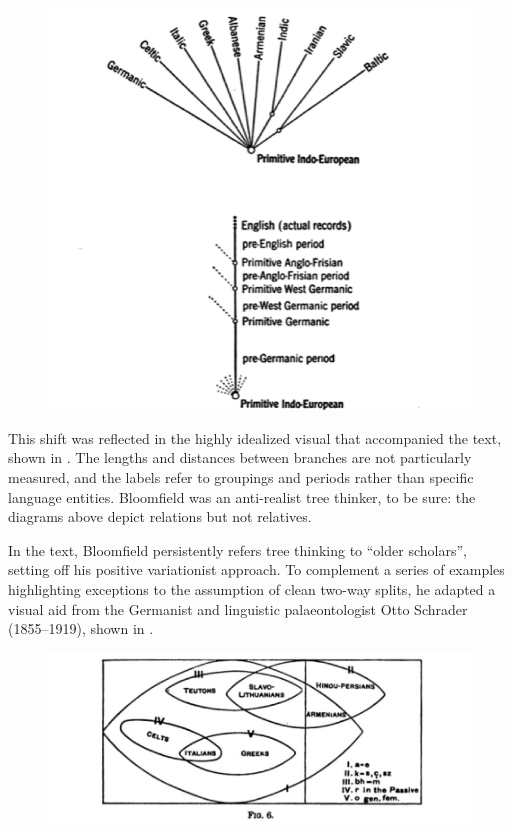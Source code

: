 \documentclass[output=paper]{langscibook}
\begin{document}
\begin{figure}
    \centering
    \includegraphics[scale=1]{figures/bloomfiield1933.png}
    \caption{\citet[312]{Bloomfield1933}}
    \label{fig:kaplan:bloomfield}
\end{figure}

This shift was reflected in the highly idealized visual that accompanied the text, shown in . The lengths and distances between branches are not particularly measured, and the labels refer to groupings and periods rather than specific language entities. Bloomfield was an anti-realist tree thinker, to be sure: the diagrams above depict relations but not relatives.

In the text, Bloomfield persistently refers tree thinking to ``older scholars'', setting off his positive variationist approach. To complement a series of examples highlighting exceptions to the assumption of clean two-way splits, he adapted a visual aid from the Germanist and linguistic palaeontologist Otto Schrader (1855--1919), shown in .

\begin{figure}
    \centering
    \includegraphics[width=\textwidth]{figures/schrader1890.png}
    \caption{\citet[65]{Schrader1890}}
    \label{fig:kaplan:schrader}
\end{figure}
\end{document}
